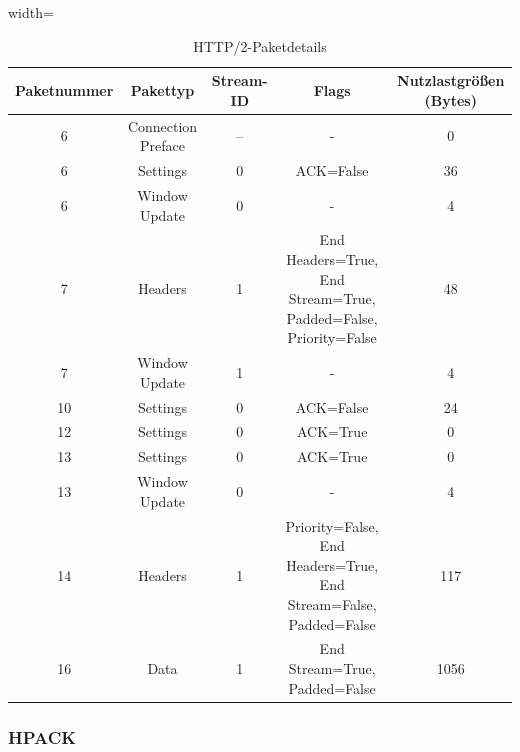 \begin{table}
    \centering
    \begin{adjustbox}{width=\textwidth}
        \begin{tabular}{|c|c|c|c|c|}
            \hline
            \textbf{Paketnummer} & \textbf{Pakettyp} & \textbf{Stream-ID} & \textbf{Flags} & \textbf{Nutzlastgrößen (Bytes)} \\
            \hline
            6 & Connection Preface & {--} & {-} & 0 \\
            6 & Settings & 0 & ACK=False & 36 \\
            6 & Window Update & 0 & {-} & 4 \\
            7 & Headers & 1 & End Headers=True, End Stream=True, Padded=False, Priority=False & 48 \\
            7 & Window Update & 1 & {-} & 4 \\
            10 & Settings & 0 & ACK=False & 24 \\
            12 & Settings & 0 & ACK=True & 0 \\
            13 & Settings & 0 & ACK=True & 0 \\
            13 & Window Update & 0 & {-} & 4 \\
            14 & Headers & 1 & Priority=False, End Headers=True, End Stream=False, Padded=False & 117 \\
            16 & Data & 1 & End Stream=True, Padded=False & 1056 \\
            \hline
        \end{tabular}
    \end{adjustbox}
    \caption{HTTP/2-Paketdetails}\label{tab:packet_details}
\end{table}

\subsubsection*{HPACK}

